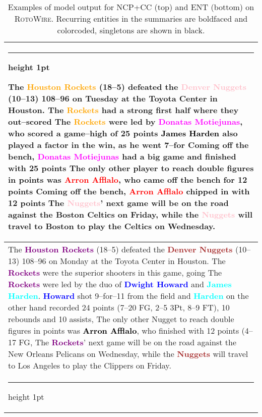 \documentclass[11pt,a4paper]{article}
\makeatletter
\newcommand{\thickhline}{\noalign {\ifnum 0=`}\fi \hrule height 1pt
    \futurelet \reserved@a \@xhline
}
\makeatother
\begin{document}
\begin{table}[t]
\footnotesize
\centering
\begin{tabular}{@{~}p{}@{~}} \thickhline
The \textcolor{orange}{\textbf{Houston Rockets}} (18--5) defeated the \textcolor{pink}{\textbf{Denver Nuggets}} 
  (10--13) 108--96 on Tuesday at the Toyota Center in Houston. The 
  \textcolor{orange}{\textbf{Rockets}} had a strong first half where they out--scored 
The \textcolor{orange}{\textbf{Rockets}} 
  were led by \textcolor{magenta}{\textbf{Donatas Motiejunas}}, who scored a game--high of 25 points 
\textcolor{black}{\textbf{James Harden}} also played a factor in the win,   as he went 7--for 
Coming off the bench, \textcolor{magenta}{\textbf{Donatas Motiejunas}} had a big game and finished with 25 points 
The only other player to reach double figures in points was \textcolor{red}{\textbf{Arron Afflalo}}, who came off the bench for 12 points 
Coming off the bench, \textcolor{red}{\textbf{Arron Afflalo}} chipped in with 12 points 
The \textcolor{pink}{\textbf{Nuggets}}' next game will be on the road against the Boston Celtics on Friday, 
  while the \textcolor{pink}{\textbf{Nuggets}} will travel to Boston to play the Celtics on Wednesday. 
  \\ \hline 
  The \textcolor{purple}{\textbf{Houston Rockets}} (18--5) defeated the \textcolor{brown}{\textbf{Denver Nuggets}}
  (10--13) 108--96 on Monday at the Toyota Center in Houston. The 
  \textcolor{purple}{\textbf{Rockets}} were the superior shooters in this game, going 
The \textcolor{purple}{\textbf{Rockets}} were led by the duo of \textcolor{blue}{\textbf{Dwight Howard}} and \textcolor{cyan}{\textbf{James Harden}}. \textcolor{blue}{\textbf{Howard}} shot 9--for--11 from the field and 
\textcolor{cyan}{\textbf{Harden}} on the other hand recorded 24 points   (7--20 FG, 2--5 3Pt, 8--9 FT), 10 rebounds and 10 assists, 
The only other Nugget to reach double figures in 
  points was \textcolor{black}{\textbf{Arron Afflalo}}, who finished with 12 points (4--17 FG,
The  
  \textcolor{purple}{\textbf{Rockets}}' next game will be on the road against the New Orleans 
  Pelicans on Wednesday, while the \textcolor{brown}{\textbf{Nuggets}} will travel to Los Angeles 
  to play the Clippers on Friday.
  \\ 
  \thickhline
\end{tabular}
\caption{\label{tab:output1} Examples of model output for NCP+CC (top)
  and ENT (bottom) on \textsc{RotoWire}. 
  Recurring entities in the summaries are boldfaced and colorcoded,
  singletons are shown in black.}
\end{table}
\end{document}
